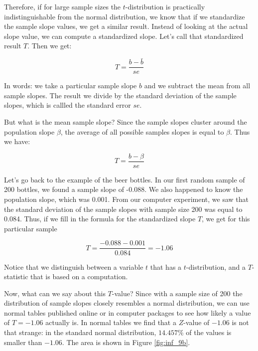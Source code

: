 \documentclass[]{report}\usepackage[]{graphicx}\usepackage[]{color}
\begin{document}
Therefore, if for large sample sizes the $t$-distribution is practically indistinguishable from the normal distribution, we know that if we standardize the sample slope values, we get a similar result. Instead of looking at the actual slope value, we can compute a standardized slope. Let's call that standardized result $T$. Then we get:


\begin{equation}
T = \frac{b-\bar{b}}{se}
\end{equation}

In words: we take a particular sample slope $b$ and we subtract the mean from all sample slopes. The result we divide by the standard deviation of the sample slopes, which is callled the standard error $se$.

But what is the mean sample slope? Since the sample slopes cluster around the population slope $\beta$, the average of all possible samples slopes is equal to $\beta$. Thus we have:

\begin{equation}
T = \frac{b-\beta}{se}
\end{equation}


Let's go back to the example of the beer bottles. In our first random sample of 200 bottles, we found a sample slope of -0.088. We also happened to know the population slope, which was 0.001. From our computer experiment, we saw that the standard deviation of the sample slopes with sample size 200 was equal to 0.084. Thus, if we fill in the formula for the standardized slope $T$, we get for this particular sample


\begin{equation}
T = \frac{-0.088-0.001}{0.084}= -1.06
\end{equation}


Notice that we distinguish between a variable $t$ that has a $t$-distribution, and a $T$-statistic that is based on a computation.


Now, what can we say about this $T$-value? Since with a sample size of 200 the distribution of sample slopes closely resembles a normal distribution, we can use normal tables published online or in computer packages to see how likely a value of $T=-1.06$ actually is. In normal tables we find that a $Z$-value of $-1.06$ is not that strange: in the standard normal distribution, $14.457$\% of the values is smaller than $-1.06$. The area is shown in Figure \ref{fig:inf_9b}.
\end{document}
